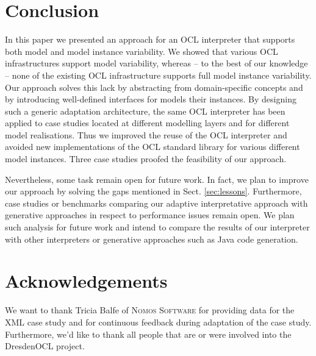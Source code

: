 \section{Conclusion}
\label{sec:conclusion}

In this paper we presented an approach for an OCL interpreter that supports both model and model
instance variability. We showed that various OCL infrastructures support model variability, whereas --
to the best of our knowledge -- none of the existing OCL infrastructure supports full model instance
variability. Our approach solves this lack by abstracting from domain-specific concepts 
and by introducing well-defined interfaces for models
their instances. By designing such a generic adaptation architecture, the same OCL interpreter has been applied to
case studies located at different modelling layers and for different model realisations. Thus we 
improved the reuse of the OCL interpreter and avoided new implementations of the OCL standard library
for various different model instances. Three case studies proofed the feasibility of our approach.

Nevertheless, some task remain open for future work. In fact, we plan to improve our approach by
solving the gaps mentioned in Sect. \ref{sec:lessons}. Furthermore, case studies or benchmarks 
comparing our adaptive interpretative approach with generative approaches in respect to performance issues 
remain open. We plan such analysis for future work and intend to compare the results of our interpreter with other
interpreters or generative approaches such as Java code generation.


\section{Acknowledgements}

We want to thank Tricia Balfe of \textsc{Nomos Software} for providing data for the XML case study and for continuous feedback during adaptation of the case study.
Furthermore, we'd like to thank all people that are or were involved into the DresdenOCL project.
